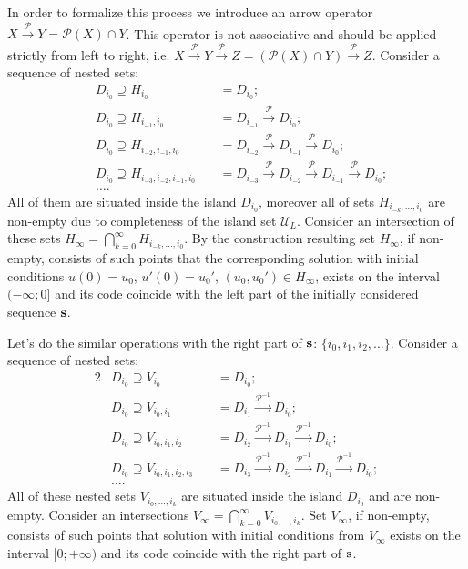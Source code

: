 In order to formalize this process we introduce an arrow operator $X \xrightarrow{\mathcal{P}} Y = \mathcal{P}(X) \cap Y$.
This operator is not associative and should be applied strictly from left to right, i.e. $X \xrightarrow{\mathcal{P}} Y \xrightarrow{\mathcal{P}} Z = (\mathcal{P}(X) \cap Y) \xrightarrow{\mathcal{P}} Z$.
Consider a sequence of nested sets:
\begin{equation}
	\begin{alignedat}{2}
		& D_{i_0} \supseteq H_{i_0} && \ = D_{i_0}; \\
		& D_{i_0} \supseteq H_{i_{-1}, i_0} && \ = D_{i_{-1}} \xrightarrow{\mathcal{P}} D_{i_0}; \\
		& D_{i_0} \supseteq H_{i_{-2}, i_{-1}, i_0} && \ = D_{i_{-2}} \xrightarrow{\mathcal{P}} D_{i_{-1}} \xrightarrow{\mathcal{P}} D_{i_0}; \\
		& D_{i_0} \supseteq H_{i_{-3}, i_{-2}, i_{-1}, i_0} && \ = D_{i_{-3}} \xrightarrow{\mathcal{P}} D_{i_{-2}} \xrightarrow{\mathcal{P}} D_{i_{-1}} \xrightarrow{\mathcal{P}} D_{i_0}; \\
		& \dots.
	\end{alignedat}
\label{eq:nested-h-sets}
\end{equation}
All of them are situated inside the island $D_{i_0}$, moreover all of sets $H_{i_{-k}, \dots, i_0}$ are non-empty due to completeness of the island set $\mathscr{U}_L$.
Consider an intersection of these sets $H_{\infty} = \bigcap_{k = 0}^{\infty} H_{i_{-k}, \dots, i_0}$.
By the construction resulting set $H_{\infty}$, if non-empty, consists of such points that the corresponding solution with initial conditions $u(0) = u_0$, $u'(0) = u_0'$, $(u_0, u_0') \in H_{\infty}$, exists on the interval $(-\infty; 0]$ and its code coincide with the left part of the initially considered sequence $\vb{s}$.

\pagebreak
Let's do the similar operations with the right part of $\vb{s}$: $\{ i_0, i_1, i_2, \dots \}$.
Consider a sequence of nested sets:
\begin{alignat*}{2}
	& D_{i_0} \supseteq V_{i_0} && \ = D_{i_0}; \\
	& D_{i_0} \supseteq V_{i_0, i_1} && \ = D_{i_1} \xrightarrow{\mathcal{P}^{-1}} D_{i_0}; \\
	& D_{i_0} \supseteq V_{i_0, i_1, i_2} && \ = D_{i_2} \xrightarrow{\mathcal{P}^{-1}} D_{i_1} \xrightarrow{\mathcal{P}^{-1}} D_{i_0}; \\
	& D_{i_0} \supseteq V_{i_0, i_1, i_2, i_3} && \ = D_{i_3} \xrightarrow{\mathcal{P}^{-1}} D_{i_2} \xrightarrow{\mathcal{P}^{-1}} D_{i_1} \xrightarrow{\mathcal{P}^{-1}} D_{i_0}; \\
	& \dots.
\end{alignat*}
All of these nested sets $V_{i_0, \dots, i_k}$ are situated inside the island $D_{i_0}$ and are non-empty.
Consider an intersections $V_{\infty} = \bigcap_{k = 0}^{\infty} V_{i_0, \dots, i_k}$.
Set $V_{\infty}$, if non-empty, consists of such points that solution with initial conditions from $V_{\infty}$ exists on the interval $[0; +\infty)$ and its code coincide with the right part of $\vb{s}$.

